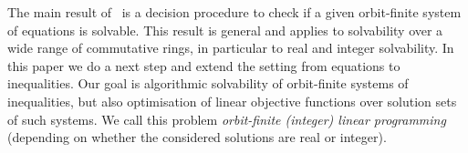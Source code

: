 The main result of~\cite{GHL22} is a decision procedure to check if a given orbit-finite system
of equations is solvable.
This result is general and applies to solvability over a wide range of commutative rings, 
in particular to real and integer solvability.
%
%
%
In this paper we do a next step and extend the setting from equations to inequalities.
Our goal is algorithmic solvability of orbit-finite systems
of inequalities, but also optimisation 
of linear objective functions
over solution sets of such systems.
%
%
We call this problem \emph{orbit-finite (integer) linear programming}
(depending on whether the considered solutions are real or integer).


